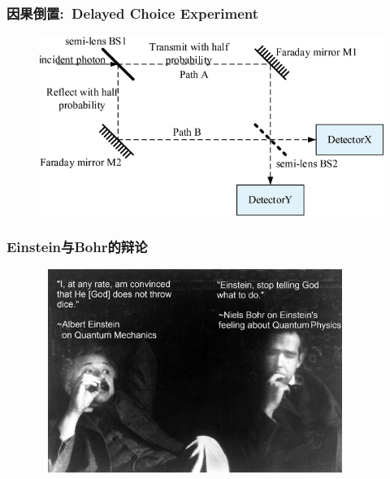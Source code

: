 \frame
{
	\frametitle{因果倒置:~\textrm{Delayed Choice Experiment}}
\begin{figure}[h!]
\centering
\vspace{-10.5pt}
\includegraphics[height=0.55\textwidth,width=1.0\textwidth,viewport=0 0 690 370,clip]{Figures/Schematic-diagram-of-delayed_choice-experiment.png}
\caption{\fontsize{5.2pt}{3.9pt}}
\label{Delayed_Choice-Experiment}
\end{figure}
}

\begin{frame}
	\frametitle{\textrm{Einstein}与\textrm{Bohr}的辩论}
            \begin{figure}
        \centering
                \includegraphics[height=2.6in, width=4.0in, viewport=0 0 2119 1460,clip]{Figures/Einstein-and-Bohr-debate.jpg}
		\label{Fig:Einstein-Bohr}
            \end{figure}
\end{frame}

